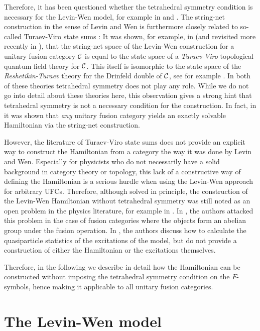Therefore, it has been questioned whether the tetrahedral symmetry condition is necessary for the Levin-Wen model, for example in \cite{Hung2012} and \cite{Lin2014}. The string-net construction in the sense of Levin and Wen is furthermore closely related to so-called Turaev-Viro state sums \cite{Turaev1992a}: It was shown, for example, in \cite{Kadar2010,Koenig2010,Kirillov2011} (and revisited more recently in \cite{Barkeshli2019a,Bauer2019}), that the string-net space of the Levin-Wen construction for a unitary fusion category ${\mathcal{C}}$ is equal to the state space of a \emph{Turaev-Viro} topological quantum field theory for ${\mathcal{C}}$. This itself is isomorphic to the state space of the \emph{Reshetikin-Turaev} theory for the Drinfeld double of ${\mathcal{C}}$, see for example \cite{Kirillov2010,Turaev2010a,Balsam2010}. In both of these theories tetrahedral symmetry does not play any role. While we do not go into detail about these theories here, this observation gives a strong hint that tetrahedral symmetry is not a necessary condition for the construction. In fact, in \cite{Hong2009} it was shown that \emph{any} unitary fusion category yields an exactly solvable Hamiltonian via the string-net construction. 

However, the literature of Turaev-Viro state sums does not provide an explicit way to construct the Hamiltonian from a category the way it was done by Levin and Wen. Especially for physicists who do not necessarily have a solid background in category theory or topology, this lack of a constructive way of defining the Hamiltonian is a serious hurdle when using the Levin-Wen approach for arbitrary UFCs. Therefore, although solved in principle, the construction of the Levin-Wen Hamiltonian without tetrahedral symmetry was still noted as an open problem in the physics literature, for example in \cite{Hung2012}. In \cite{Lin2014}, the authors attacked this problem in the case of fusion categories where the objects form an abelian group under the fusion operation. In \cite{Lan2014}, the authors discuss how to calculate the quasiparticle statistics of the excitations of the model, but do not provide a construction of either the Hamiltonian or the excitations themselves.

Therefore, in the following we describe in detail how the Hamiltonian can be constructed without imposing the tetrahedral symmetry condition on the $F$-symbols, hence making it applicable to all unitary fusion categories.

\section{The Levin-Wen model}

